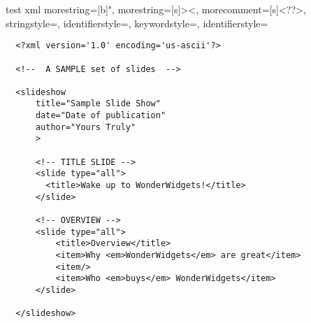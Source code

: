 test xml
{
  morestring=[b]",
  morestring=[s]{>}{<},
  morecomment=[s]{<?}{?>},
  stringstyle=\color{black},
  identifierstyle=\color{darkblue},
  keywordstyle=\color{cyan},
  identifierstyle=\color{maroon}
}




\begin{lstlisting}
  <?xml version='1.0' encoding='us-ascii'?>

  <!--  A SAMPLE set of slides  -->

  <slideshow
      title="Sample Slide Show"
      date="Date of publication"
      author="Yours Truly"
      >

      <!-- TITLE SLIDE -->
      <slide type="all">
        <title>Wake up to WonderWidgets!</title>
      </slide>

      <!-- OVERVIEW -->
      <slide type="all">
          <title>Overview</title>
          <item>Why <em>WonderWidgets</em> are great</item>
          <item/>
          <item>Who <em>buys</em> WonderWidgets</item>
      </slide>

  </slideshow>
\end{lstlisting}
